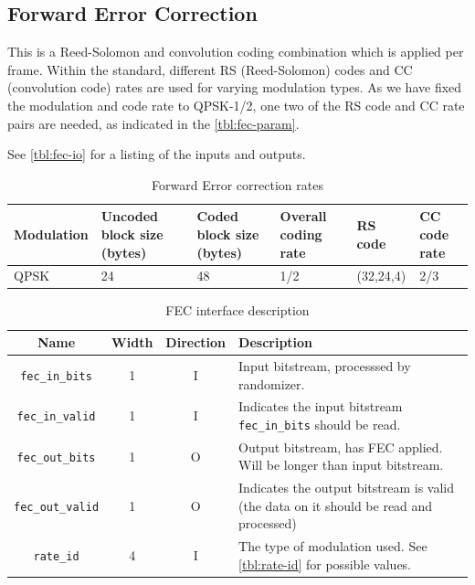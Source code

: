 \documentclass[dvips,10pt,twocolumn]{article}
\begin{document}

\subsection{Forward Error Correction}
	\label{sec:fec}
	This is a Reed-Solomon and convolution coding combination
	which is applied per frame. Within the standard, different
	RS (Reed-Solomon) codes and CC (convolution code) rates are
	used for varying modulation types. As we have fixed the
	modulation and code rate to QPSK-1/2, one two of the RS
	code and CC rate pairs are needed, as indicated in the
	\autoref{tbl:fec-param}.

	See \autoref{tbl:fec-io} for a listing of the inputs and outputs.
	
	\begin{table}
		\begin{tabularx}{\textwidth}{X|X|X|X|X|X}
		\label{tbl:fec-param}
			Modulation & Uncoded block size (bytes) &
			Coded block size (bytes) & Overall coding
			rate & RS code & CC code rate \\ \hline
			QPSK & 24 & 48 & 1/2 & (32,24,4) & 2/3 \\
		\end{tabularx}
		\caption{Forward Error correction rates}
	\end{table}

	\begin{table} \begin{tabularx}{\textwidth}{c|c|c|X}
		\label{tbl:fec-io}
		Name & Width & Direction & Description \\ \hline

		\texttt{fec\_in\_bits} & 1 & I & Input bitstream, processsed by randomizer.
		\\

		\texttt{fec\_in\_valid} & 1 & I & Indicates the input bitstream
		\texttt{fec\_in\_bits} should be read.\\

		\texttt{fec\_out\_bits} & 1 & O & Output bitstream, has FEC
		applied. Will be longer than input bitstream. \\

		\texttt{fec\_out\_valid} & 1 & O & Indicates the output bitstream
		is valid (the data on it should be read and processed) \\

		\texttt{rate\_id} & 4 & I & The type of modulation used. See
		\autoref{tbl:rate-id} for possible values.

	\end{tabularx} \caption{FEC interface description} \end{table}
\end{document}
